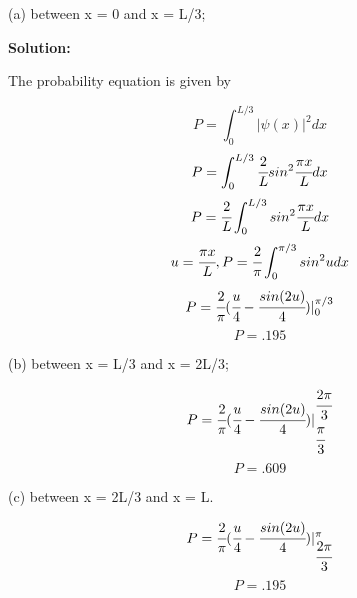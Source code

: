 \documentclass{article}
\begin{document}
(a) between x = 0 and x = L/3;

\textbf{Solution:}

The probability equation is given by

$$ P = \int_{0}^{L/3} |\psi(x)|^2 dx $$
$$ P = \int_{0}^{L/3} \cfrac{2}{L} sin^2 \cfrac{ \pi x}{L} dx $$
$$ P = \cfrac{2}{L} \int_{0}^{L/3} sin^2 \cfrac{ \pi x}{L} dx $$
$$ u = \cfrac{\pi x}{L}, P = \cfrac{2}{\pi} \int_{0}^{\pi/3} sin^2 u dx $$
$$ P = \cfrac{2}{\pi} (\cfrac{u}{4} - \cfrac{sin(2u)}{4}) \rvert_{0}^{\pi / 3}  $$
$$ P = .195 $$



(b) between x = L/3 and x = 2L/3;

$$ P = \cfrac{2}{\pi} (\cfrac{u}{4} - \cfrac{sin(2u)}{4}) \rvert_{\cfrac{\pi}{3}}^{\cfrac{2\pi}{3}}  $$
$$ P = .609 $$


(c) between x = 2L/3 and x = L.

$$ P = \cfrac{2}{\pi} (\cfrac{u}{4} - \cfrac{sin(2u)}{4}) \rvert_{\cfrac{2\pi}{3}}^{\pi}  $$
$$ P = .195 $$
\end{document}

